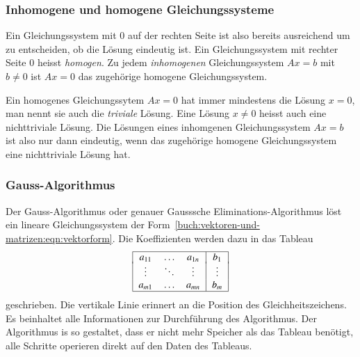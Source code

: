 \subsubsection{Inhomogene und homogene Gleichungssysteme}
Ein Gleichungssystem mit $0$ auf der rechten Seite ist also bereits
ausreichend um zu entscheiden, ob die Lösung eindeutig ist.
Ein Gleichungssystem mit rechter Seite $0$ heisst {\em homogen}.
%
Zu jedem {\em inhomogenen} Gleichungssystem $Ax=b$ mit $b\ne 0$ 
ist $Ax=0$ das zugehörige homogene Gleichungssystem.

Ein homogenes Gleichungssytem $Ax=0$ hat immer mindestens die 
Lösung $x=0$, man nennt sie auch die {\em triviale} Lösung.
Eine Lösung $x\ne 0$ heisst auch eine nichttriviale Lösung.
Die Lösungen eines inhomgenen Gleichungssystem $Ax=b$ ist also nur dann
eindeutig, wenn das zugehörige homogene Gleichungssystem eine nichttriviale
Lösung hat.

\subsubsection{Gauss-Algorithmus}
Der Gauss-Algorithmus oder genauer Gausssche Eliminations-Algorithmus
löst ein lineare Gleichungssystem der
Form~\eqref{buch:vektoren-und-matrizen:eqn:vektorform}.
Die Koeffizienten werden dazu in das Tableau 
\[
\begin{tabular}{|>{$}c<{$}>{$}c<{$}>{$}c<{$}|>{$}c<{$}|}
\hline
a_{11}&\dots &a_{1n}&b_1   \\[-2pt]
\vdots&\ddots&\vdots&\vdots\\
a_{m1}&\dots &a_{mn}&b_m   \\
\hline
\end{tabular}
\]
geschrieben.
Die vertikale Linie erinnert an die Position des Gleichheitszeichens.
Es beinhaltet alle Informationen zur Durchführung des Algorithmus.
Der Algorithmus is so gestaltet, dass er nicht mehr Speicher als
das Tableau benötigt, alle Schritte operieren direkt auf den Daten
des Tableaus.

